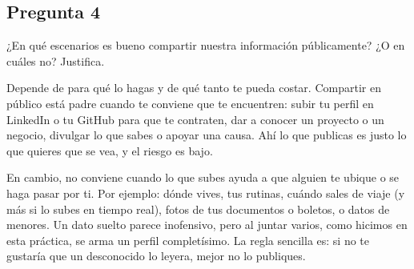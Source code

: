\subsection{Pregunta 4}

¿En qué escenarios es bueno compartir nuestra información públicamente? ¿O en cuáles no? Justifica.

\begin{respuesta}
    Depende de para qué lo hagas y de qué tanto te pueda costar. Compartir en público
    está padre cuando te conviene que te encuentren: subir tu perfil en LinkedIn o tu
    GitHub para que te contraten, dar a conocer un proyecto o un negocio, divulgar lo
    que sabes o apoyar una causa. Ahí lo que publicas es justo lo que quieres que se
    vea, y el riesgo es bajo.

    En cambio, no conviene cuando lo que subes ayuda a que alguien te ubique o se haga
    pasar por ti. Por ejemplo: dónde vives, tus rutinas, cuándo sales de viaje (y más si
    lo subes en tiempo real), fotos de tus documentos o boletos, o datos de menores. Un
    dato suelto parece inofensivo, pero al juntar varios, como hicimos en esta práctica,
    se arma un perfil completísimo. La regla sencilla es: si no te gustaría que un
    desconocido lo leyera, mejor no lo publiques.
\end{respuesta}
